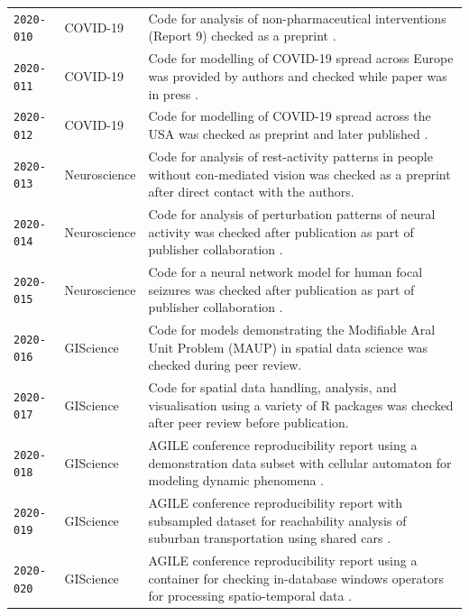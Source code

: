 \documentclass[12pt]{article}
\begin{document}
\begin{table}
\begin{tabular}{llp{12cm}}
    \texttt{2020-010}  \cite{cert-2020-010} & COVID-19 & Code for analysis of non-pharmaceutical interventions (Report 9) checked as a preprint \cite{ferguson_report_2020}. \\ %
    \texttt{2020-011}  \cite{cert-2020-011} & COVID-19 & Code for modelling of COVID-19 spread across Europe was provided by authors and checked while paper was in press \cite{flaxman_estimating_2020}. \\
    \texttt{2020-012}  \cite{cert-2020-012} & COVID-19 & Code for modelling of COVID-19 spread across the USA was checked as preprint \cite{unwin_report_2020} and later published \cite{unwin_state-level_2020}. \\
    \texttt{2020-013}  \cite{cert-2020-013} & Neuroscience & Code for analysis of rest-activity patterns in people without con-mediated vision was checked as a preprint \cite{Spitschan2020.06.02.129502} after direct contact with the authors. \\ %
    \texttt{2020-014}  \cite{cert-2020-014} & Neuroscience & Code for analysis of perturbation patterns of neural activity was checked after publication as part of publisher collaboration \cite{Sadeh2020}. \\ %
    \texttt{2020-015}  \cite{cert-2020-015} & Neuroscience & Code for a neural network model for human focal seizures was checked after publication as part of publisher collaboration \cite{Liou2020}. \\ %
    \texttt{2020-016}  \cite{cert-2020-016} & GIScience & Code for models demonstrating the Modifiable Aral Unit Problem (MAUP) in spatial data science \cite{Brunsdon2020} was checked during peer review. \\ %
    \texttt{2020-017}  \cite{cert-2020-017} & GIScience & Code for spatial data handling, analysis, and visualisation using a variety of R packages \cite{Bivand2020} was checked after peer review before publication. \\ %
    \texttt{2020-018}  \cite{cert-2020-018} & GIScience & AGILE conference reproducibility report using a demonstration data subset with cellular automaton for modeling dynamic phenomena \cite{Hojati2020}. \\ %
    \texttt{2020-019}  \cite{cert-2020-019} & GIScience & AGILE conference reproducibility report with subsampled dataset for reachability analysis of suburban transportation using shared cars \cite{Illium2020}. \\
    \texttt{2020-020}  \cite{cert-2020-020} & GIScience & AGILE conference reproducibility report using a container for checking in-database windows operators for processing spatio-temporal data \cite{Werner2020}. \\ %

\end{tabular}
\end{table}
\end{document}
